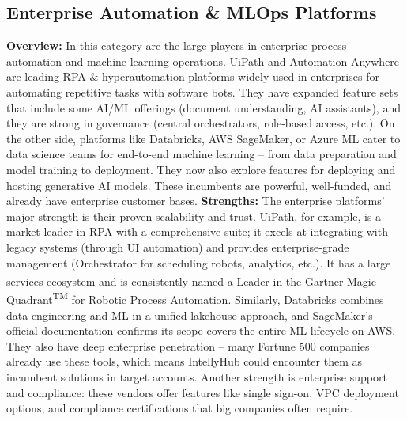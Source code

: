 \documentclass[11pt, a4paper, oneside]{article}
\begin{document}
\subsection{Enterprise Automation \& MLOps Platforms}
\textbf{Overview:} In this category are the large players in enterprise process automation and machine learning operations. UiPath and Automation Anywhere are leading RPA \& hyperautomation platforms widely used in enterprises for automating repetitive tasks with software bots. They have expanded feature sets that include some AI/ML offerings (document understanding, AI assistants), and they are strong in governance (central orchestrators, role-based access, etc.). On the other side, platforms like Databricks, AWS SageMaker, or Azure ML cater to data science teams for end-to-end machine learning – from data preparation and model training to deployment. They now also explore features for deploying and hosting generative AI models. These incumbents are powerful, well-funded, and already have enterprise customer bases.
\newline\newline
\textbf{Strengths:} The enterprise platforms' major strength is their proven scalability and trust. UiPath, for example, is a market leader in RPA with a comprehensive suite; it excels at integrating with legacy systems (through UI automation) and provides enterprise-grade management (Orchestrator for scheduling robots, analytics, etc.). It has a large services ecosystem and is consistently named a Leader in the Gartner\textsuperscript{\textregistered} Magic Quadrant\textsuperscript{TM} for Robotic Process Automation\cite{uipathGartner}. Similarly, Databricks combines data engineering and ML in a unified lakehouse approach, and SageMaker's official documentation confirms its scope covers the entire ML lifecycle on AWS\cite{awsSagemaker}. They also have deep enterprise penetration – many Fortune 500 companies already use these tools, which means IntellyHub could encounter them as incumbent solutions in target accounts. Another strength is enterprise support and compliance: these vendors offer features like single sign-on, VPC deployment options, and compliance certifications that big companies often require.
\newline\newline
\end{document}
